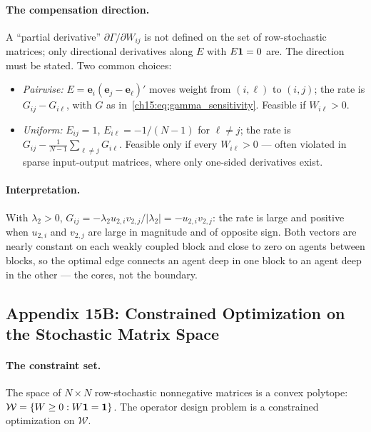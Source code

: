 \documentclass[../structural_economics_book.tex]{subfiles}
\begin{document}
\paragraph{The compensation direction.} A ``partial derivative'' $\partial\Gamma/\partial W_{ij}$ is not defined on the set of row-stochastic matrices; only directional derivatives along $E$ with $E\mathbf{1} = 0$ are. The direction must be stated. Two common choices:
\begin{itemize}
\item \emph{Pairwise:} $E = \mathbf{e}_i(\mathbf{e}_j - \mathbf{e}_\ell)'$ moves weight from $(i,\ell)$ to $(i,j)$; the rate is $G_{ij} - G_{i\ell}$, with $G$ as in~\eqref{ch15:eq:gamma_sensitivity}. Feasible if $W_{i\ell} > 0$.
\item \emph{Uniform:} $E_{ij} = 1$, $E_{i\ell} = -1/(N-1)$ for $\ell \neq j$; the rate is $G_{ij} - \frac{1}{N-1}\sum_{\ell \neq j}G_{i\ell}$. Feasible only if every $W_{i\ell} > 0$ --- often violated in sparse input-output matrices, where only one-sided derivatives exist.
\end{itemize}

\paragraph{Interpretation.} With $\lambda_2 > 0$, $G_{ij} = -\lambda_2 u_{2,i}v_{2,j}/|\lambda_2| = -u_{2,i}v_{2,j}$: the rate is large and positive when $u_{2,i}$ and $v_{2,j}$ are large in magnitude and of opposite sign. Both vectors are nearly constant on each weakly coupled block and close to zero on agents between blocks, so the optimal edge connects an agent deep in one block to an agent deep in the other --- the cores, not the boundary.


\subsection*{Appendix 15B: Constrained Optimization on the Stochastic Matrix Space}
\label{ch15:app:constrained}

\paragraph{The constraint set.} The space of $N \times N$ row-stochastic nonnegative matrices is a convex polytope: $\mathcal{W} = \{W \geq 0 : W\mathbf{1} = \mathbf{1}\}$. The operator design problem is a constrained optimization on $\mathcal{W}$.
\end{document}
